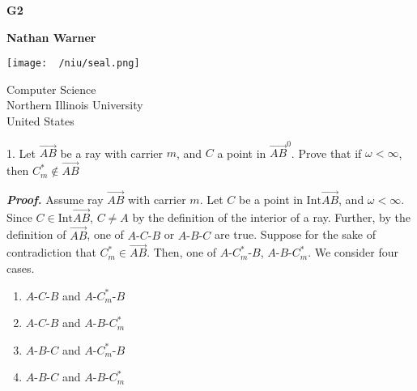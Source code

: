 \documentclass{report}
\title{\Huge{}}
\author{\huge{Nathan Warner}}
\date{\huge{}}
\begin{document}
        \begin{titlepage}
       \begin{center}
           \vspace*{1cm}
    
           \textbf{G2}
    
           \vspace{0.5cm}
            
                
           \vspace{1.5cm}
    
           \textbf{Nathan Warner}
    
           \vfill
                
                
           \vspace{0.8cm}
         
           \texttt{[image: ~/niu/seal.png]}
                
           Computer Science \\
           Northern Illinois University\\
           United States\\
           
                
       \end{center}
    \end{titlepage}
    \tableofcontents
    \pagebreak 
    \begin{mdframed}
        1. Let $\overrightarrow{AB}$ be a ray with carrier $m$, and $C$ a point in $\overrightarrow{AB}^{0} $. Prove that if $\omega < \infty$, then $C_{m}^{*} \not\in \overrightarrow{AB} $
    \end{mdframed}
    \bigbreak \noindent 
    \textbf{\textit{Proof.}} Assume ray $\overrightarrow{AB}$  with carrier $m$. Let $C$ be a point in $\text{Int}\overrightarrow{AB}$, and $\omega < \infty$.
    \bigbreak \noindent 
    Since $C \in \text{Int}\overrightarrow{AB}$, $C \ne A$ by the definition of the interior of a ray. Further, by the definition of $\overrightarrow{AB}$, one of $ A\text{-}C\text{-}B$ or $ A\text{-}B\text{-}C$ are true.
    \bigbreak \noindent 
    Suppose for the sake of contradiction that $C^{*}_{m} \in \overrightarrow{AB}$. Then, one of $ A\text{-}C^{*}_{m}\text{-}B$, $ A\text{-}B\text{-}C_{m}^{*}$. We consider four cases.
    \begin{enumerate}
        \item $ A\text{-}C\text{-}B $ and $ A\text{-}C_{m}^{*}\text{-} B$
        \item $ A\text{-}C\text{-}B$ and $ A\text{-}B\text{-}C_{m}^{*} $
        \item $ A\text{-}B\text{-}C $ and $ A\text{-}C^{*}_{m}\text{-}B $
        \item $ A\text{-}B\text{-}C$ and $ A\text{-}B\text{-}C_{m}^{*} $
    \end{enumerate}
\end{document}
